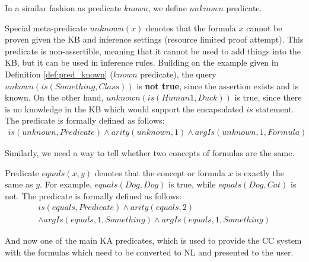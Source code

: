 In a similar fashion as predicate $known$, we define $unknown$ predicate.

\begin{definition}\label{def:pred_unknown}
Special meta-predicate $unknown(x)$ denotes that the formula $x$ cannot be 
proven given the KB and inference settings (resource limited proof attempt). 
This predicate is non-assertible, meaning that 
it cannot be used to add things into the KB, but it can be used in inference 
rules. Building on the example given in Definition \ref{def:pred_known}
($known$ predicate), the query $unkown(is(Something,Class))$ is 
\textbf{not true}, since the assertion exists and is known. On the other hand,
$unknown(is(Human1,Duck))$ is true, since there is no knowledge in the KB which
would support the encapsulated $is$ statement. The predicate is formally defined 
as follows:
\begin{equation}\label{as:unknown}
\begin{gathered}
	is(unknown,Predicate) \land arity(unknown,1) \land argIs(unknown,1,Formula)
\end{gathered}
\end{equation}
\end{definition}

Similarly, we need a way to tell whether two concepts of formulas are the same.
\begin{definition}\label{def:pred_equals}
Predicate $equals(x,y)$ denotes that the concept or formula $x$ is exactly 
the same as $y$. For example, $equals(Dog,Dog)$ is true, while 
$equals(Dog,Cat)$ is not. The predicate is formally defined as follows:
\begin{equation}\label{as:equals}
\begin{gathered}
	is(equals,Predicate) \land arity(equals,2)\\
 	\land argIs(equals,1,Something) \land argIs(equals,1,Something)
\end{gathered}
\end{equation}
\end{definition}

And now one of the main KA predicates, which is used to provide the CC system
with the formulas which need to be converted to NL and presented to the user.

